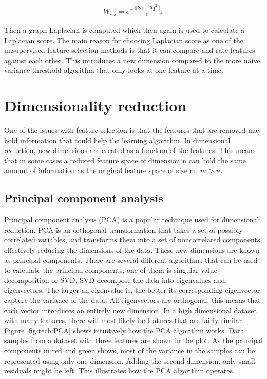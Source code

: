        \begin{align}\label{eq:tech_LS}
            W_{i,j} = e^-{\frac{||{\bm{X_i}-\bm{X_j}}^2||}{t}},
        \end{align}
        
Then a graph Laplacian is computed which then again is used to calculate a Laplacian score. The main reason for choosing Laplacian score as one of the unsupervised feature selection methods is that it can compare and rate features against each other. This introduces a new dimension compared to the more naive variance threshold algorithm that only looks at one feature at a time. 
    

\section{Dimensionality reduction}\label{sec:dim_red}
    One of the issues with feature selection is that the features that are removed may hold information that could help the learning algorithm. In dimensional reduction, new dimensions are created as a function of the features. This means that in some cases a reduced feature space of dimension n can hold the same amount of information as the original feature space of size m, $m>n$.

    \subsection{Principal component analysis}\label{subsec:PCA}
        Principal component analysis (PCA) is a popular technique used for dimensional reduction. PCA is an orthogonal transformation that takes a set of possibly correlated variables, and transforms them into a set of noncorrelated components, effectively reducing the dimensions of the data. These new dimensions are known as principal components. There are several different algorithms that can be used to calculate the principal components, one of them is singular value decomposition or SVD. SVD decompose the data into eigenvalues and eigenvectors. The larger an eigenvalue is, the better its corresponding eigenvector capture the variance of the data. All eigenvectors are orthogonal, this means that each vector introduces an entirely new dimension. In a high dimensional dataset with many features, there will most likely be features that are fairly similar. Figure \ref{fig:tech:PCA} shows intuitively how the PCA algorithm works. Data samples from a dataset with three features are shown in the plot. As the principal components in red and green shows, most of the variance in the samples can be represented using only one dimension. Adding the second dimension, only small residuals might be left. This illustrates how the PCA algorithm operates. 
        

